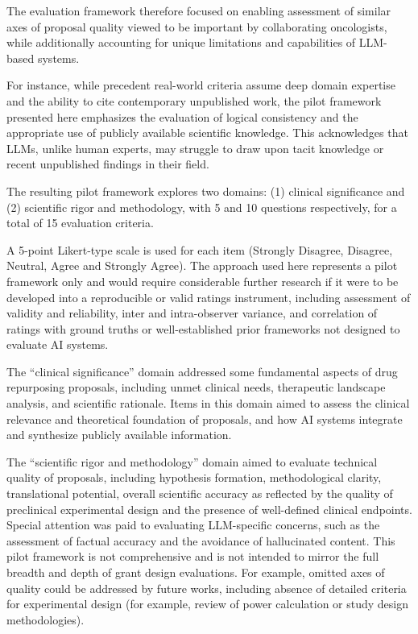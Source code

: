 The evaluation framework therefore focused on enabling assessment of similar axes of proposal quality viewed to be important by collaborating oncologists, while additionally accounting for unique limitations and capabilities of LLM-based systems.

For instance, while precedent real-world criteria assume deep domain expertise and the ability to cite contemporary unpublished work, the pilot framework presented here emphasizes the evaluation of logical consistency and the appropriate use of publicly available scientific knowledge. This acknowledges that LLMs, unlike human experts, may struggle to draw upon tacit knowledge or recent unpublished findings in their field.

The resulting pilot framework explores two domains: (1) clinical significance and (2) scientific rigor and methodology, with 5 and 10 questions respectively, for a total of 15 evaluation criteria.

A 5-point Likert-type scale is used for each item (Strongly Disagree, Disagree, Neutral, Agree and Strongly Agree). The approach used here represents a pilot framework only and would require considerable further research if it were to be developed into a reproducible or valid ratings instrument, including assessment of validity and reliability, inter and intra-observer variance, and correlation of ratings with ground truths or well-established prior frameworks not designed to evaluate AI systems.

The ``clinical significance'' domain addressed some fundamental aspects of drug repurposing proposals, including unmet clinical needs, therapeutic landscape analysis, and scientific rationale. Items in this domain aimed to assess the clinical relevance and theoretical foundation of proposals, and how AI systems integrate and synthesize publicly available information.

The ``scientific rigor and methodology'' domain aimed to evaluate technical quality of proposals, including hypothesis formation, methodological clarity, translational potential, overall scientific accuracy as reflected by the quality of preclinical experimental design and the presence of well-defined clinical endpoints. Special attention was paid to evaluating LLM-specific concerns, such as the assessment of factual accuracy and the avoidance of hallucinated content. This pilot framework is not comprehensive and is not intended to mirror the full breadth and depth of grant design evaluations. For example, omitted axes of quality could be addressed by future works, including absence of detailed criteria for experimental design (for example, review of power calculation or study design methodologies).

